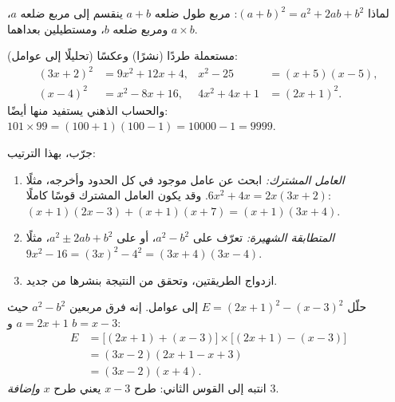 \begin{omfigure}

{\small لماذا $(a+b)^2 = a^2 + 2ab + b^2$: مربع طول ضلعه $a + b$ ينقسم
إلى مربع ضلعه $a$، ومربع ضلعه $b$، ومستطيلين بعداهما
$a \times b$.}
\end{omfigure}

\begin{example}\label{ex:g10:algebra:identities}
مستعملة طردًا (نشرًا) وعكسًا (تحليلًا إلى عوامل):
\begin{align*}
(3x + 2)^2 &= 9x^2 + 12x + 4,
& x^2 - 25 &= (x+5)(x-5), \\
(x - 4)^2 &= x^2 - 8x + 16,
& 4x^2 + 4x + 1 &= (2x + 1)^2 .
\end{align*}
والحساب الذهني يستفيد منها أيضًا: $101 \times 99 = (100+1)(100-1) =
10000 - 1 = 9999$.
\end{example}

\begin{method}\label{met:g10:algebra:factor}
جرّب، بهذا الترتيب:
\begin{enumerate}
  \item \emph{العامل المشترك:} ابحث عن عامل موجود في كل الحدود
        وأخرجه، مثلًا $6x^2 + 4x = 2x(3x + 2)$. وقد يكون العامل المشترك
        قوسًا كاملًا: $(x+1)(2x-3) + (x+1)(x+7) = (x+1)(3x+4)$.
  \item \emph{المتطابقة الشهيرة:} تعرّف على $a^2 - b^2$، أو على
        $a^2 \pm 2ab + b^2$، مثلًا $9x^2 - 16 = (3x)^2 - 4^2 =
        (3x+4)(3x-4)$.
  \item ازدواج الطريقتين، وتحقق من النتيجة بنشرها من جديد.
\end{enumerate}
\end{method}

\begin{example}\label{ex:g10:algebra:factorsteps}
حلّل $E = (2x + 1)^2 - (x - 3)^2$ إلى عوامل. إنه فرق مربعين
$a^2 - b^2$ حيث $a = 2x+1$ و $b = x-3$:
\begin{align*}
E &= \bigl[(2x+1) + (x-3)\bigr] \times \bigl[(2x+1) - (x-3)\bigr] \\
  &= (3x - 2)(2x + 1 - x + 3) \\
  &= (3x - 2)(x + 4).
\end{align*}
انتبه إلى القوس الثاني: طرح $x - 3$ يعني طرح $x$
\emph{وإضافة} $3$.
\end{example}

